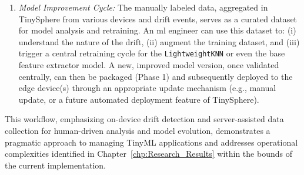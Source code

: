 \begin{enumerate}
    \item \textit{Model Improvement Cycle:} The manually labeled data, aggregated in TinySphere from various devices and drift events, serves as a curated dataset for model analysis and retraining. An \gls{ml} engineer can use this dataset to: (i) understand the nature of the drift, (ii) augment the training dataset, and (iii) trigger a central retraining cycle for the \texttt{LightweightKNN} or even the base feature extractor model. A new, improved model version, once validated centrally, can then be packaged (Phase 1) and subsequently deployed to the edge device(s) through an appropriate update mechanism (e.g., manual update, or a future automated deployment feature of TinySphere).
\end{enumerate}

This workflow, emphasizing on-device drift detection and server-assisted data collection for human-driven analysis and model evolution, demonstrates a pragmatic approach to managing TinyML applications and addresses operational complexities identified in Chapter~\ref{chp:Research_Results} within the bounds of the current implementation.

